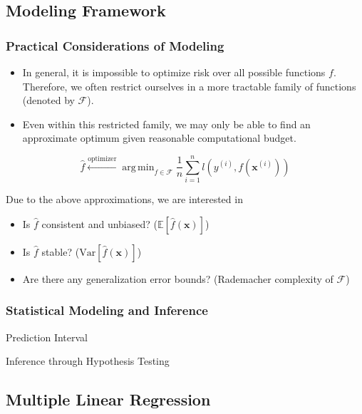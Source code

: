 \documentclass{beamer}
\DeclareMathOperator*{\argmin}{arg\,min}
\begin{document}
\subsection{Modeling Framework}

\begin{frame}
\frametitle{Practical Considerations of Modeling}

\begin{itemize}
    \item In general, it is impossible to optimize risk over all possible functions $f$. Therefore, we often restrict ourselves in a more tractable family of functions (denoted by $\mathcal{F}$).
    \item Even within this restricted family, we may only be able to find an approximate optimum given reasonable computational budget.
\end{itemize}

$$
\hat{f} \stackrel{\text{optimizer}}{\longleftarrow} \argmin_{f \in \mathcal{F}} \frac{1}{n} \sum_{i=1}^{n} l(y^{(i)}, f(\boldsymbol{x}^{(i)}))
$$

Due to the above approximations, we are interested in
\begin{itemize}
    \item Is $\hat{f}$ consistent and unbiased? ($\mathbb{E}[\hat{f}(\boldsymbol{x})]$)
    \item Is $\hat{f}$ stable? ($\text{Var}[\hat{f}(\boldsymbol{x})]$)
    \item Are there any generalization error bounds? (Rademacher complexity of $\mathcal{F}$)
\end{itemize}

\end{frame}


\begin{frame}
\frametitle{Statistical Modeling and Inference}

Prediction Interval

Inference through Hypothesis Testing

\end{frame}


\subsection{Multiple Linear Regression}
\end{document}
